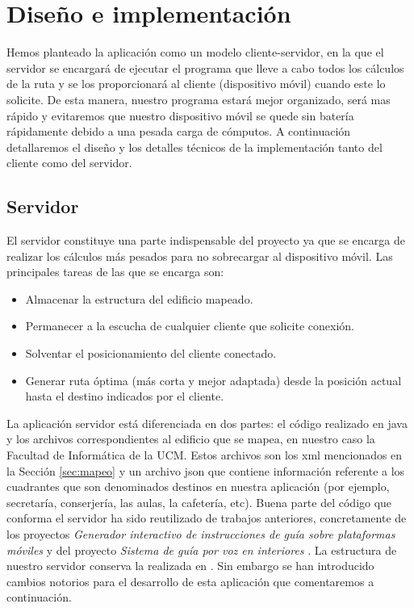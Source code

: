 \chapter{Diseño e implementación}
\label{cap:diseñoeimplementación}


Hemos planteado la aplicación como un modelo cliente-servidor, en la que el servidor se encargará de ejecutar el programa que lleve a cabo todos los cálculos de la ruta y se los proporcionará al cliente (dispositivo móvil) cuando este lo solicite. De esta manera, nuestro programa estará mejor organizado, será mas rápido y evitaremos que nuestro dispositivo móvil se quede sin batería rápidamente debido a una pesada carga de cómputos. A continuación detallaremos el diseño y los detalles técnicos de la implementación tanto del cliente como del servidor.


\section{Servidor}
El servidor constituye una parte indispensable del proyecto ya que se encarga de realizar los cálculos más pesados para no sobrecargar al dispositivo móvil. Las principales tareas de las que se encarga son:
\begin{itemize}
	\item Almacenar la estructura del edificio mapeado.
	\item Permanecer a la escucha de cualquier cliente que solicite conexión.
	\item Solventar el posicionamiento del cliente conectado.
	\item Generar ruta óptima (más corta y mejor adaptada) desde la posición actual hasta el destino indicados por el cliente.
\end{itemize} 

La aplicación servidor está diferenciada en dos partes: el código realizado en java y los archivos correspondientes al edificio que se mapea, en nuestro caso la Facultad de Informática de la UCM. Estos archivos son los xml mencionados en la Sección \ref{sec:mapeo} y un archivo json que contiene información referente a los cuadrantes que son denominados destinos en nuestra aplicación (por ejemplo, secretaría, conserjería, las aulas, la cafetería, etc). 
Buena parte del código que conforma el servidor ha sido reutilizado de trabajos anteriores, concretamente de los proyectos \textit{Generador interactivo de instrucciones de guía sobre plataformas móviles} \citep{TFGguia} y del proyecto \textit{Sistema de guía por voz en interiores} \citep{TFGMariana}. La estructura de nuestro servidor conserva la realizada en \cite{TFGguia}. Sin embargo se han introducido cambios notorios para el desarrollo de esta aplicación que comentaremos a continuación.

